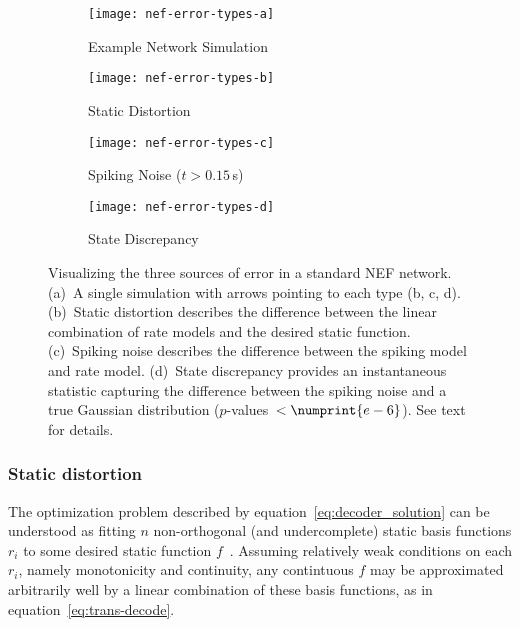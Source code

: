 \begin{figure}
  \centering
  \begin{subfigure}{\textwidth}
    \centering
    \texttt{[image: nef-error-types-a]}
    \caption{Example Network Simulation}
    \label{fig:nef-error-types-a}
  \end{subfigure}
  \begin{subfigure}{.33\textwidth}
    \centering
    \texttt{[image: nef-error-types-b]}
    \caption{Static Distortion}
    \label{fig:nef-error-types-b}
  \end{subfigure}%
  \begin{subfigure}{.33\textwidth}
    \centering
    \texttt{[image: nef-error-types-c]}
    \caption{Spiking Noise ($t > 0.15$\,s)}
    \label{fig:nef-error-types-c}
  \end{subfigure}%
  \begin{subfigure}{.33\textwidth}
    \centering
    \texttt{[image: nef-error-types-d]}
    \caption{State Discrepancy}
    \label{fig:nef-error-types-d}
  \end{subfigure}
  \caption[Three sources of error in spiking networks.]{ \label{fig:nef-error-types}
    Visualizing the three sources of error in a standard NEF network.
    (a)~A single simulation with arrows pointing to each type (b, c, d).
    (b)~Static distortion describes the difference between the linear combination of rate models and the desired static function.
    (c)~Spiking noise describes the difference between the spiking model and rate model.
    (d)~State discrepancy provides an instantaneous statistic capturing the difference between the spiking noise and a true Gaussian distribution ($p$-values~$< \numprint{e-6}$).
    See text for details.
  }
\end{figure}


\subsubsection{Static distortion}

The optimization problem described by equation~\ref{eq:decoder_solution} can be understood as fitting $n$ non-orthogonal (and undercomplete) static basis functions $r_i$ to some desired static function $f$~\citep{broomhead1988radial}.
Assuming relatively weak conditions on each $r_i$, namely monotonicity and continuity, any contintuous $f$ may be approximated arbitrarily well by a linear combination of these basis functions, as in equation~\ref{eq:trans-decode}.

